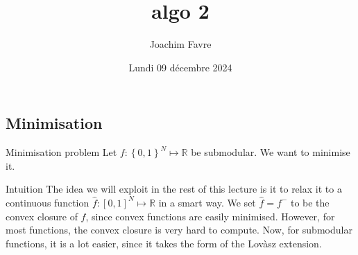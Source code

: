 \documentclass[a4paper]{article}
\title{algo 2}
\author{Joachim Favre}
\date{Lundi 09 décembre 2024}
\begin{document}
\maketitle


\subsection{Minimisation}

\begin{parag}{Minimisation problem}
    Let $f: \left\{0, 1\right\}^N \mapsto \mathbb{R}$ be submodular. We want to minimise it.

    \begin{subparag}{Intuition}
        The idea we will exploit in the rest of this lecture is it to relax it to a continuous function $\hat{f}: \left[0, 1\right]^N \mapsto \mathbb{R}$ in a smart way. We set $\hat{f} = f^-$ to be the convex closure of $f$, since convex functions are easily minimised. However, for most functions, the convex closure is very hard to compute. Now, for submodular functions, it is a lot easier, since it takes the form of the Lovàsz extension.
    \end{subparag}
\end{parag}
\end{document}
